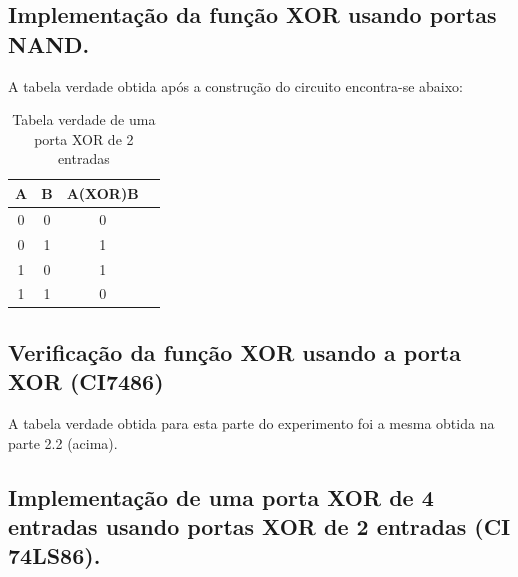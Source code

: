 \documentclass[12pt]{article}
\begin{document}
\subsection{Implementação da função XOR usando portas NAND.}
\label{sec:XOR}

A tabela verdade obtida após a construção do circuito encontra-se abaixo:

\begin{table}[H]
	\centering
	\begin{tabular}{|c|c|c|c|}
		\cline{1-4}
		\caption{Tabela verdade de uma porta XOR de 2 entradas}
		\multicolumn{1}{|c|}{A} & \multicolumn{1}{|c|}{B} & \multicolumn{1}{|c|}{A(XOR)B} \\
		\hline
		 0 & 0 & 0 \\
		 0 & 1 & 1 \\
		 1 & 0 & 1 \\
		 1 & 1 & 0 \\
		\hline
	\end{tabular}
	\label{Porta NAND}
\end{table}

\subsection{Verificação da função XOR usando a porta XOR (CI7486)}

A tabela verdade obtida para esta parte do experimento foi a mesma obtida na parte 2.2 (acima).

\subsection{Implementação de uma porta XOR de 4 entradas usando portas XOR de 2 entradas (CI 74LS86).}
\label{XOR2}
\end{document}
